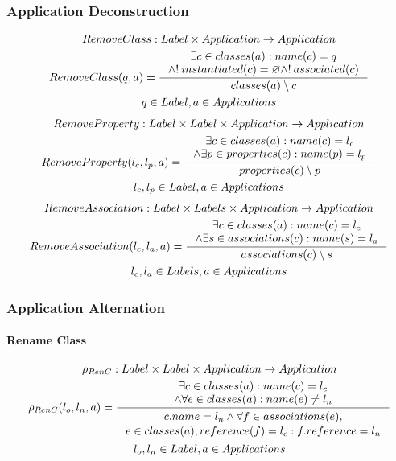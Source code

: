\documentclass[11pt]{article}
\begin{document}
\subsubsection{Application Deconstruction}
\begin{gather*}
RemoveClass: Label \times Application \rightarrow Application  \\
RemoveClass(q, a) = \inference{\exists c \in classes(a) : name(c) = q \\
\wedge !\: instantiated(c) = \varnothing \wedge ! \: associated(c)} {classes(a) \setminus c } \\
q \in Label, a \in Applications
\end{gather*}
\begin{gather*}
RemoveProperty: Label \times Label \times Application \rightarrow Application \\
RemoveProperty(l_c, l_p, a) = \inference{\exists c \in classes(a) : name(c) = l_c \\ \wedge \exists p \in properties(c) : name(p) = l_p}{properties(c) \setminus p }\\
l_c, l_p \in Label, a \in Applications 
\end{gather*}
\begin{gather*}
RemoveAssociation : Label \times Labels \times Application \rightarrow Application \\ 
RemoveAssociation(l_c, l_a, a) = \inference{\exists c \in classes(a) : name(c) = l_c \\ \wedge \exists s \in associations(c) : name(s) = l_a }{associations(c) \setminus s} \\
l_c, l_a \in Labels, a \in Applications
\end{gather*}


\subsubsection{Application Alternation}
\paragraph{Rename Class}
\begin{gather*}
\rho_{RenC} : Label \times Label \times Application \rightarrow Application \\ 
\rho_{RenC}(l_o, l_n, a) = \inference{\exists c \in classes(a) : name(c) = l_c \\ \wedge \forall e \in classes(a) : name(e) \neq l_n}{\begin{gathered}
c.name = l_n \wedge \forall f \in associations(e), \\ e \in classes(a), reference(f) = l_c : f.reference = l_n 
\end{gathered}}\\
l_o, l_n \in Label, a \in Applications
\end{gather*}
\end{document}
